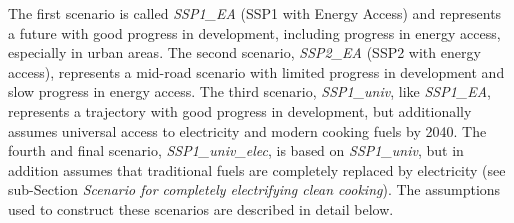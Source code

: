 \documentclass[
]{article}
\begin{document}
The first scenario is called \emph{SSP1\_EA} (SSP1 with Energy Access) and represents a future with good progress in development, including progress in energy access, especially in urban areas. The second scenario, \emph{SSP2\_EA} (SSP2 with energy access), represents a mid-road scenario with limited progress in development and slow progress in energy access. The third scenario, \emph{SSP1\_univ}, like \emph{SSP1\_EA}, represents a trajectory with good progress in development, but additionally assumes universal access to electricity and modern cooking fuels by 2040. The fourth and final scenario, \emph{SSP1\_univ\_elec}, is based on \emph{SSP1\_univ}, but in addition assumes that traditional fuels are completely replaced by electricity (see sub-Section \emph{Scenario for completely electrifying clean cooking}). The assumptions used to construct these scenarios are described in detail below.
\end{document}
